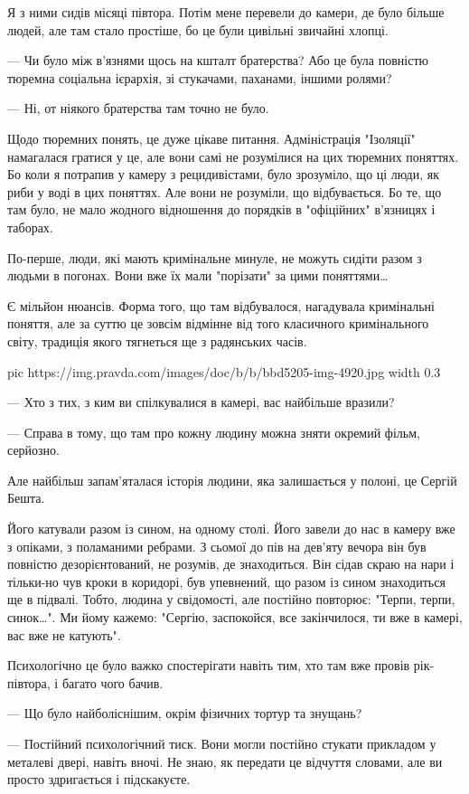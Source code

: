 Я з ними сидів місяці півтора. Потім мене перевели до камери, де було більше
людей, але там стало простіше, бо це були цивільні звичайні хлопці.

— Чи було між в'язнями щось на кшталт братерства? Або це була повністю тюремна
соціальна ієрархія, зі стукачами, паханами, іншими ролями?

— Ні, от ніякого братерства там точно не було.

Щодо тюремних понять, це дуже цікаве питання. Адміністрація "Ізоляції"
намагалася гратися у це, але вони самі не розумілися на цих тюремних поняттях.
Бо коли я потрапив у камеру з рецидивістами, було зрозуміло, що ці люди, як
риби у воді в цих поняттях. Але вони не розуміли, що відбувається. Бо те, що
там було, не мало жодного відношення до порядків в "офіційних" в’язницях і
таборах.

По-перше, люди, які мають кримінальне минуле, не можуть сидіти разом з людьми в
погонах. Вони вже їх мали "порізати" за цими поняттями…

Є мільйон нюансів. Форма того, що там відбувалося, нагадувала кримінальні
поняття, але за суттю це зовсім відмінне від того класичного кримінального
світу, традиція якого тягнеться ще з радянських часів.

\ifcmt
  pic https://img.pravda.com/images/doc/b/b/bbd5205-img-4920.jpg
	width 0.3
\fi

— Хто з тих, з ким ви спілкувалися в камері, вас найбільше вразили?

— Справа в тому, що там про кожну людину можна зняти окремий фільм, серйозно.

Але найбільш запам’яталася історія людини, яка залишається у полоні, це Сергій
Бешта.

Його катували разом із сином, на одному столі. Його завели до нас в камеру вже
з опіками, з поламаними ребрами. З сьомої до пів на дев’яту вечора він був
повністю дезорієнтований, не розумів, де знаходиться. Він сідав скраю на нари і
тільки-но чув кроки в коридорі, був упевнений, що разом із сином знаходиться ще
в підвалі. Тобто, людина у свідомості, але постійно повторює: "Терпи, терпи,
синок…". Ми йому кажемо: "Сергію, заспокойся, все закінчилося, ти вже в камері,
вас вже не катують".

Психологічно це було важко спостерігати навіть тим, хто там вже провів
рік-півтора, і багато чого бачив.

— Що було найболіснішим, окрім фізичних тортур та знущань?

— Постійний психологічний тиск. Вони могли постійно стукати прикладом у металеві двері, навіть вночі. Не знаю, як передати це відчуття словами, але ви просто здригається і підскакуєте. 

